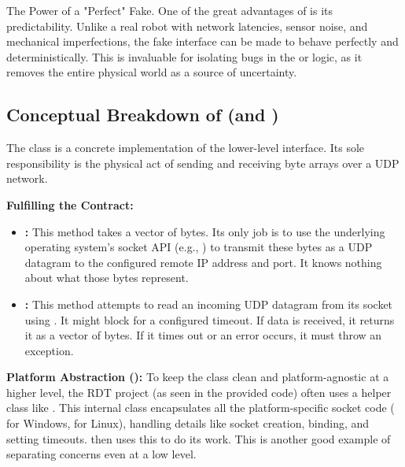 \begin{principlebox}{The Power of a "Perfect" Fake.}
    One of the great advantages of  is its predictability. Unlike a real robot with network latencies, sensor noise, and mechanical imperfections, the fake interface can be made to behave perfectly and deterministically. This is invaluable for isolating bugs in the  or  logic, as it removes the entire physical world as a source of uncertainty.
\end{principlebox}

\subsection{Conceptual Breakdown of  (and )}
\label{subsec:conceptual_udp_transport}

The  class is a concrete implementation of the lower-level  interface. Its sole responsibility is the physical act of sending and receiving byte arrays over a UDP network.


    \textbf{Fulfilling the  Contract:}
        \begin{itemize}
            \item \textbf{:} This method takes a vector of bytes. Its only job is to use the underlying operating system's socket API (e.g., ) to transmit these bytes as a UDP datagram to the configured remote IP address and port. It knows nothing about what those bytes represent.
            \item \textbf{:} This method attempts to read an incoming UDP datagram from its socket using . It might block for a configured timeout. If data is received, it returns it as a vector of bytes. If it times out or an error occurs, it must throw an exception.
        \end{itemize}
    \textbf{Platform Abstraction ():} To keep the  class clean and platform-agnostic at a higher level, the RDT project (as seen in the provided code) often uses a helper class like . This internal class encapsulates all the platform-specific socket code ( for Windows,  for Linux), handling details like socket creation, binding, and setting timeouts.  then uses this  to do its work. This is another good example of separating concerns even at a low level.

